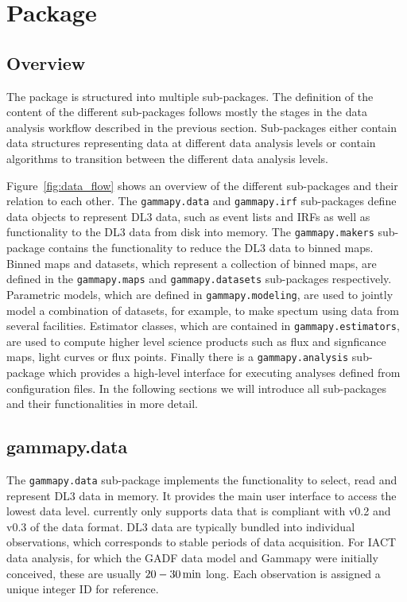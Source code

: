 \documentclass[traditabstract, longauth]{aa}
\newcommand{\code}[1]{\texttt{#1}}
\begin{document}
\section{\gammapy Package}
\label{sec:gammapy-package}
\subsection{Overview}
\label{ssec:overview}
%
%
The \gammapy package is structured into multiple sub-packages. The definition
of the content of the different sub-packages follows mostly the stages in the
data analysis workflow described in the previous section. Sub-packages
either contain data structures representing data at different data analysis
levels or contain algorithms to transition between the different data analysis
levels.

Figure~\ref{fig:data_flow} shows an overview of the different sub-packages and
their relation to each other. The \code{gammapy.data} and \code{gammapy.irf}
sub-packages define data objects to represent DL3 data, such as
event lists and IRFs as well as functionality
to the DL3 data from disk into memory. The \code{gammapy.makers} sub-package
contains the functionality to reduce the DL3 data to binned maps.
Binned maps and datasets, which represent a collection of binned
maps, are defined in the \code{gammapy.maps} and \code{gammapy.datasets}
sub-packages respectively. Parametric models, which are defined in
\code{gammapy.modeling}, are used to jointly model a combination
of datasets, for example, to make spectum using data from several facilities. Estimator classes,
which are contained in \code{gammapy.estimators}, are used to
compute higher level science products such as flux and signficance maps,
light curves or flux points. Finally there is a \code{gammapy.analysis}
sub-package which provides a high-level interface for executing analyses
defined from configuration files. In the following sections we will
introduce all sub-packages and their functionalities in more detail.


\subsection{gammapy.data}
\label{ssec:gammapy-data}
The \code{gammapy.data} sub-package implements the functionality to select,
read and represent DL3 \gammaray data in memory. It provides the main user
interface to access the lowest data level. \gammapy currently only
supports data that is compliant with v0.2 and v0.3 of the \gadf data format.
DL3 data are typically bundled into individual observations, which
corresponds to stable periods of data acquisition. For IACT data analysis,
for which the GADF data model and Gammapy were initially conceived,
these are usually $20 - 30\,{\rm min}$ long.
Each observation is assigned a unique integer ID for reference.
\end{document}
